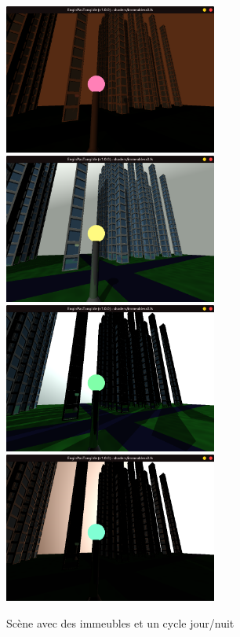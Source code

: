 \begin{figure}[h]
    \centering
    \includegraphics[width=7cm]{images/screens/ville1matin.png}
    \includegraphics[width=7cm]{images/screens/ville2jour.png}
    \includegraphics[width=7cm]{images/screens/ville3aprem.png}
    \includegraphics[width=7cm]{images/screens/ville4soir.png}
    \caption{Scène avec des immeubles et un cycle jour/nuit}
    \label{fig:city}
\end{figure}